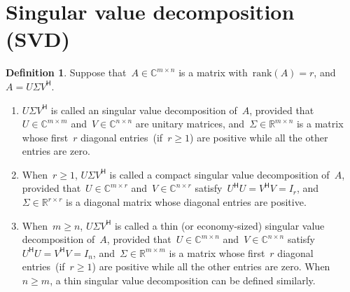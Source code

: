\documentclass[11pt,a4paper]{article}  %
\numberwithin{equation}{section}
\newtheorem{remark}{Remark}%
\theoremstyle{definition}
\newtheorem{definition}{Definition}%
\def\RR{\mathbb{R}}
\def\CC{\mathbb{C}}
\newcommand{\hmt}{{\scriptscriptstyle{{\mathsf{H}}}}}
\newcommand{\rank}{\mathrm{rank}}
\begin{document}


\section{Singular value decomposition (SVD)}

\begin{definition}
  \label{def:svd}
  Suppose that~$A\in \CC^{m\times n}$ is a matrix with~$\rank(A) = r$, and~$A = U\Sigma V^\hmt$.
  \begin{enumerate}[leftmargin=1.5em]
    \item
      $U\Sigma V^\hmt$ is called an singular value decomposition of~$A$,
      provided that~$U \in \CC^{m\times m}$ and~$V\in\CC^{n\times n}$ are unitary matrices,
      and~$\Sigma \in \RR^{m\times n}$ is a matrix whose first~$r$ diagonal entries~(if~$r\ge 1$)
      are positive while all the other entries are zero.
    \item
      When~$r \ge 1$, $U\Sigma V^\hmt$ is called a compact singular value decomposition of~$A$,
      provided that~$U \in \CC^{m\times r}$ and~$V\in \CC^{n\times r}$ satisfy~$U^\hmt U = V^\hmt V = I_r$,
      and~$\Sigma \in \RR^{r\times r}$ is a diagonal matrix whose diagonal entries are positive.
  \item When~$m\ge n$, $U\Sigma V^\hmt$ is called a thin (or economy-sized) singular value
      decomposition of~$A$,
      provided that~$U \in \CC^{m\times n}$ and~$V\in \CC^{n\times n}$ satisfy~$U^\hmt U = V^\hmt V = I_n$,
      and~$\Sigma \in \RR^{m\times m}$ is a matrix whose first~$r$ diagonal entries~(if~$r\ge 1$)
      are positive while all the other entries are zero.
      When~$n\ge m$, a thin singular value decomposition can be defined similarly.
  \end{enumerate}
\end{definition}
\end{document}
